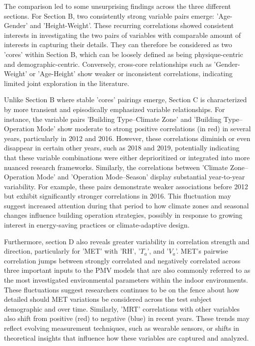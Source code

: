 \documentclass[final,3p,times,12pt]{elsarticle}
\begin{document}
The comparison led to some unsurprising findings across the three different sections. For Section B, two consistently strong variable pairs emerge: 'Age-Gender' and 'Height-Weight'. These recurring correlations showed consistent interests in investigating the two pairs of variables with comparable amount of interests in capturing their details. They can therefore be considered as two 'cores' within Section B, which can be loosely defined as being physique-centric and demographic-centric. Conversely, cross-core relationships such as 'Gender-Weight' or 'Age-Height' show weaker or inconsistent correlations, indicating limited joint exploration in the literature.

Unlike Section B where stable 'cores' pairings emerge, Section C is characterized by more transient and episodically emphasized variable relationships. For instance, the variable pairs 'Building Type–Climate Zone' and 'Building Type–Operation Mode' show moderate to strong positive correlations (in red) in several years, particularly in 2012 and 2016. However, these correlations diminish or even disappear in certain other years, such as 2018 and 2019, potentially indicating that these variable combinations were either deprioritized or integrated into more nuanced research frameworks. Similarly, the correlations between 'Climate Zone–Operation Mode' and 'Operation Mode–Season' display substantial year-to-year variability. For example, these pairs demonstrate weaker associations before 2012 but exhibit significantly stronger correlations in 2016. This fluctuation may suggest increased attention during that period to how climate zones and seasonal changes influence building operation strategies, possibly in response to growing interest in energy-saving practices or climate-adaptive design.

Furthermore, section D also reveals greater variability in correlation strength and direction, particularly for 'MET' with 'RH', '$T_a$', and '$V_a$'. MET's pairwise correlation jumps between strongly correlated and negatively correlated across three important inputs to the PMV models that are also commonly referred to as the most investigated environmental parameters within the indoor environments. These fluctuations suggest researchers continues to be on the fence about how detailed should MET variations be considered across the test subject demographic and over time. Similarly, 'MRT' correlations with other variables also shift from positive (red) to negative (blue) in recent years. These trends may reflect evolving measurement techniques, such as wearable sensors, or shifts in theoretical insights that influence how these variables are captured and analyzed.
\end{document}
